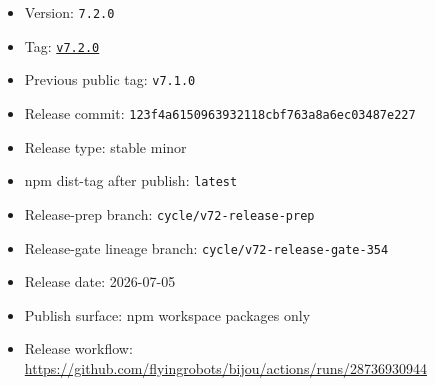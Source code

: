 \begin{itemize}
\tightlist
\item
  Version: \texttt{7\allowbreak{}.\allowbreak{}2\allowbreak{}.\allowbreak{}0}
\item
  Tag: \href{https://github.com/flyingrobots/bijou/releases/tag/v7.2.0}{\texttt{v\allowbreak{}7\allowbreak{}.\allowbreak{}2\allowbreak{}.\allowbreak{}0}}
\item
  Previous public tag: \texttt{v\allowbreak{}7\allowbreak{}.\allowbreak{}1\allowbreak{}.\allowbreak{}0}
\item
  Release commit: \texttt{1\allowbreak{}2\allowbreak{}3\allowbreak{}f\allowbreak{}4\allowbreak{}a\allowbreak{}6\allowbreak{}1\allowbreak{}5\allowbreak{}0\allowbreak{}9\allowbreak{}6\allowbreak{}3\allowbreak{}9\allowbreak{}3\allowbreak{}2\allowbreak{}1\allowbreak{}1\allowbreak{}8\allowbreak{}c\allowbreak{}b\allowbreak{}f\allowbreak{}7\allowbreak{}6\allowbreak{}3\allowbreak{}a\allowbreak{}8\allowbreak{}a\allowbreak{}6\allowbreak{}e\allowbreak{}c\allowbreak{}0\allowbreak{}3\allowbreak{}4\allowbreak{}8\allowbreak{}7\allowbreak{}e\allowbreak{}2\allowbreak{}2\allowbreak{}7}
\item
  Release type: stable minor
\item
  npm dist-tag after publish: \texttt{l\allowbreak{}a\allowbreak{}t\allowbreak{}e\allowbreak{}s\allowbreak{}t}
\item
  Release-prep branch: \texttt{c\allowbreak{}y\allowbreak{}c\allowbreak{}l\allowbreak{}e\allowbreak{}/\allowbreak{}v\allowbreak{}7\allowbreak{}2\allowbreak{}-\allowbreak{}r\allowbreak{}e\allowbreak{}l\allowbreak{}e\allowbreak{}a\allowbreak{}s\allowbreak{}e\allowbreak{}-\allowbreak{}p\allowbreak{}r\allowbreak{}e\allowbreak{}p}
\item
  Release-gate lineage branch: \texttt{c\allowbreak{}y\allowbreak{}c\allowbreak{}l\allowbreak{}e\allowbreak{}/\allowbreak{}v\allowbreak{}7\allowbreak{}2\allowbreak{}-\allowbreak{}r\allowbreak{}e\allowbreak{}l\allowbreak{}e\allowbreak{}a\allowbreak{}s\allowbreak{}e\allowbreak{}-\allowbreak{}g\allowbreak{}a\allowbreak{}t\allowbreak{}e\allowbreak{}-\allowbreak{}3\allowbreak{}5\allowbreak{}4}
\item
  Release date: 2026-07-05
\item
  Publish surface: npm workspace packages only
\item
  Release workflow: \url{https://github.com/flyingrobots/bijou/actions/runs/28736930944}
\end{itemize}

